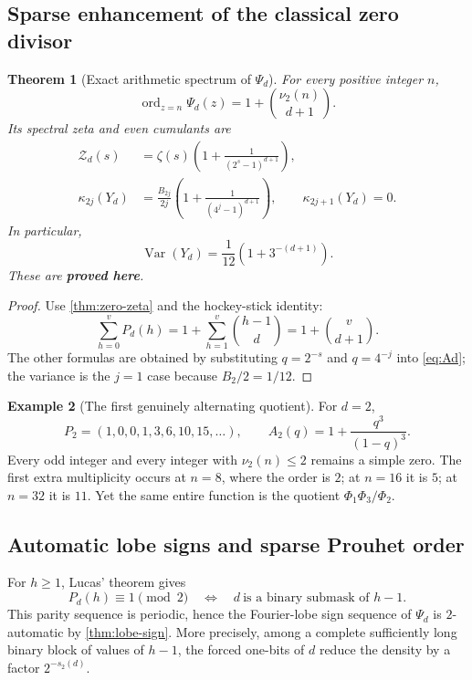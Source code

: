 \documentclass[11pt,oneside]{article}
\numberwithin{equation}{section}
\newtheorem{theorem}{Theorem}[section]
\theoremstyle{definition}
\newtheorem{example}[theorem]{Example}
\theoremstyle{remark}
\newcommand{\Var}{\operatorname{Var}}
\newcommand{\ord}{\operatorname{ord}}
\newcommand{\statusproved}{\textcolor{deepgreen}{\textbf{proved here}}}
\newcommand{\Zspec}{\mathcal Z}
\begin{document}
\subsection{Sparse enhancement of the classical zero divisor}

\begin{theorem}[Exact arithmetic spectrum of $\Psi_d$]
\label{thm:Psi-spectrum}
For every positive integer $n$,
\begin{equation}
 \boxed{
 \ord_{z=n}\Psi_d(z)
 =1+\binom{\nu_2(n)}{d+1}.}
 \label{eq:Psi-multiplicity}
\end{equation}
Its spectral zeta and even cumulants are
\begin{align}
 \Zspec_d(s)
 &=\zeta(s)\left(1+\frac1{(2^s-1)^{d+1}}\right),
 \label{eq:Psi-zeta}\\
 \kappa_{2j}(Y_d)
 &=\frac{B_{2j}}{2j}
   \left(1+\frac1{(4^j-1)^{d+1}}\right),
 \qquad \kappa_{2j+1}(Y_d)=0.
 \label{eq:Psi-cumulants}
\end{align}
In particular,
\begin{equation}
 \Var(Y_d)=\frac1{12}\left(1+3^{-(d+1)}\right).
 \label{eq:Psi-variance}
\end{equation}
These are \statusproved.
\end{theorem}

\begin{proof}
Use \cref{thm:zero-zeta} and the hockey-stick identity:
\[
 \sum_{h=0}^{v}P_d(h)
 =1+\sum_{h=1}^{v}\binom{h-1}{d}
 =1+\binom{v}{d+1}.
\]
The other formulas are obtained by substituting $q=2^{-s}$ and $q=4^{-j}$ into
\eqref{eq:Ad}; the variance is the $j=1$ case because $B_2/2=1/12$.
\end{proof}

\begin{example}[The first genuinely alternating quotient]
For $d=2$,
\[
 P_2=(1,0,0,1,3,6,10,15,\ldots),
 \qquad
 A_2(q)=1+\frac{q^3}{(1-q)^3}.
\]
Every odd integer and every integer with $\nu_2(n)\le2$ remains a simple zero.  The first
extra multiplicity occurs at $n=8$, where the order is $2$; at $n=16$ it is $5$; at
$n=32$ it is $11$.  Yet the same entire function is the quotient
$\Phi_1\Phi_3/\Phi_2$.
\end{example}

\subsection{Automatic lobe signs and sparse Prouhet order}

For $h\ge1$, Lucas' theorem gives
\begin{equation}
 P_d(h)\equiv1\pmod2
 \quad\Longleftrightarrow\quad
 d\ \text{is a binary submask of }h-1.
 \label{eq:Pd-lucas}
\end{equation}
This parity sequence is periodic, hence the Fourier-lobe sign sequence of $\Psi_d$ is
$2$-automatic by \cref{thm:lobe-sign}.  More precisely, among a complete sufficiently
long binary block of values of $h-1$, the forced one-bits of $d$ reduce the density by a
factor $2^{-s_2(d)}$.
\end{document}
